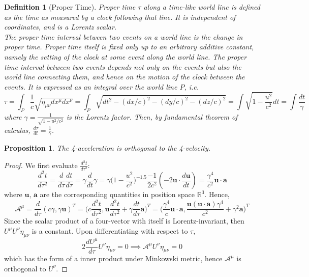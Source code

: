\documentclass[a4paper]{article}
\theoremstyle{new}
\newtheorem{defi}{Definition}[section]
\newtheorem{prop}{Proposition}[section]
\begin{document}
\begin{defi}[Proper Time]
Proper time $\tau$ along a time-like world line is defined as the time as measured by a clock following that line. It is independent of coordinates, and is a Lorentz scalar.\\[5pt]
The proper time interval between two events on a world line is the change in proper time. Proper time itself is fixed only up to an arbitrary additive constant, namely the setting of the clock at some event along the world line. The proper time interval between two events depends not only on the events but also the world line connecting them, and hence on the motion of the clock between the events. It is expressed as an integral over the world line $P$, i.e.
$$\tau=\int_P\frac{1}{c}\sqrt{\eta_{\mu\nu}dx^\mu dx^\nu}=\int_P\sqrt{dt^2-(dx/c)^2-(dy/c)^2-(dz/c)^2}=\int\sqrt{1-\frac{u^2}{c^2}}dt=\int\frac{dt}{\gamma}$$
where $\gamma=\frac{1}{\sqrt{1-u^2/c^2}}$ is the Lorentz factor. Then, by fundamental theorem of calculus, $\frac{d\tau}{dt}=\frac{1}{\gamma}$.
\end{defi}
\begin{prop}
The 4-acceleration is orthogonal to the 4-velocity.
\end{prop}
\begin{proof}
We first evaluate $\frac{d^2t}{d\tau^2}$:
$$\frac{d^2t}{d\tau^2}=\frac{d}{d\tau}\frac{dt}{d\tau}=\gamma\frac{d}{dt}\gamma=\gamma\bigg(1-\frac{u^2}{c^2}\bigg)^{-1.5}\frac{-1}{2c^2}(-2\mathbf{u}\cdot\frac{d\mathbf{u}}{dt})=\frac{\gamma^4}{c^2}\mathbf{u}\cdot\mathbf{a}$$
where $\mathbf{u}$, $\mathbf{a}$ are the corresponding quantities in position space $\mathbb{R}^3$. Hence,
$$\mathcal{A}^\mu=\frac{d}{d\tau}(c\gamma,\gamma\mathbf{u})^T=\bigg(c\frac{d^2t}{d\tau^2},\mathbf{u}\frac{d^2t}{d\tau^2}+\gamma\frac{dt}{d\tau}\mathbf{a}\bigg)^T=\bigg(\frac{\gamma^4}{c}\mathbf{u}\cdot\mathbf{a},\frac{\mathbf{u}(\mathbf{u}\cdot\mathbf{a})\gamma^4}{c^2}+\gamma^2\mathbf{a}\bigg)^T$$
Since the scalar product of a four-vector with itself is Lorentz-invariant, then $U^\mu U^\nu\eta_{\mu\nu}$ is a constant. Upon differentiating with respect to $\tau$,
$$2\frac{dU^\mu}{d\tau}U^\nu\eta_{\mu\nu}=0\implies\mathcal{A}^\mu U^\nu\eta_{\mu\nu}=0$$
which has the form of a inner product under Minkowski metric, hence $\mathcal{A}^\mu$ is orthogonal to $U^\nu$.
\end{proof}
\end{document}
